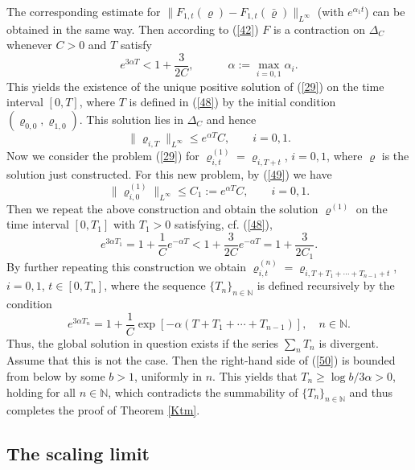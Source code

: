 \documentclass[reqno,11pt]{amsart}
\theoremstyle{definition}
\theoremstyle{remark}
\numberwithin{equation}{section}
\begin{document}
The corresponding estimate for $\| F_{1,t} (\varrho)  - F_{1,t}
(\bar{\varrho}) \|_{L^\infty}$ (with $e^{\alpha_1 t}$) can be
obtained in the same way. Then according to (\ref{42}) $F$ is a
contraction on $\varDelta_C$ whenever $C>0$ and $T$ satisfy
\begin{equation}
  \label{48}
 e^{3 \alpha T} < 1 + \frac{3}{2C}, \quad \qquad \alpha
 :=\max_{i=0,1}\alpha_i.
\end{equation}
This yields the existence of the unique positive solution of
(\ref{29}) on the time interval $[0,T]$, where $T$ is defined in
(\ref{48}) by the initial condition $(\varrho_{0,0},
\varrho_{1,0})$. This solution lies in $\varDelta_C$ and hence
\begin{equation}
  \label{49}
\|\varrho_{i,T}\|_{L^\infty} \leq e^{\alpha T} C, \qquad i=0,1.
\end{equation}
Now we consider the problem (\ref{29}) for $\varrho^{(1)}_{i, t} =
\varrho_{i,T+t}$, $i=0,1$, where $\varrho$ is the solution just
constructed. For this new problem, by (\ref{49}) we have
\[
\|\varrho^{(1)}_{i,0}\|_{L^\infty} \leq C_1 := e^{\alpha T} C,
\qquad i=0,1.
\]
Then we repeat the above construction and obtain the solution
$\varrho^{(1)}$ on the time interval $[0,T_1]$ with $T_1>0$
satisfying, cf. (\ref{48}),
\[
e^{3 \alpha T_1} = 1 + \frac{1}{C} e^{-\alpha T} < 1 +
\frac{3}{2C}e^{-\alpha T} = 1 + \frac{3}{2C_1}.
\]
By further repeating this construction we obtain
$\varrho_{i,t}^{(n)} = \varrho_{i, T+T_1 + \cdots + T_{n-1} + t}$,
$i=0,1$, $t\in [0,T_n]$, where the sequence $\{T_n\}_{n\in
\mathds{N}}$ is defined recursively by the condition
\begin{equation}
  \label{50}
e^{3 \alpha T_n} = 1 +  \frac{1}{C}\exp\left[ -\alpha \left(T + T_1
+\cdots + T_{n-1}\right) \right], \quad n\in \mathds{N}.
\end{equation}
Thus, the global solution in question exists if the series $\sum_{n}
T_n$ is divergent. Assume that this is not the case. Then the
right-hand side of (\ref{50}) is bounded from below by some $b
>1$, uniformly in $n$. This yields that $T_n \geq \log b/ 3
\alpha >0$, holding for all $n\in \mathds{N}$, which contradicts the
summability of $\{T_n\}_{n\in \mathds{N}}$ and thus completes the
proof of Theorem \ref{Ktm}.

\subsection{The scaling limit}
\end{document}
